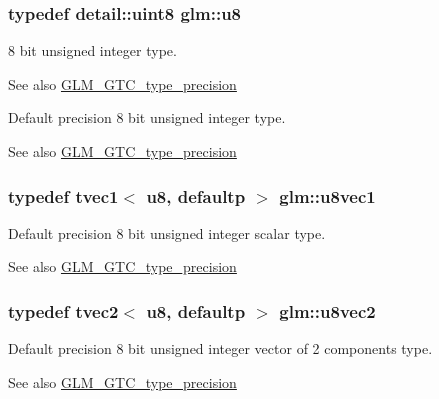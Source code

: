 \subsubsection[{u8}]{\setlength{\rightskip}{0pt plus 5cm}typedef {\bf detail\+::uint8} {\bf glm\+::u8}}\label{group__gtc__type__precision_ga5e3dc67373d5068997d2d9f41c9024d2}
8 bit unsigned integer type. \begin{DoxySeeAlso}{See also}
\hyperlink{group__gtc__type__precision}{G\+L\+M\+\_\+\+G\+T\+C\+\_\+type\+\_\+precision}
\end{DoxySeeAlso}
Default precision 8 bit unsigned integer type. \begin{DoxySeeAlso}{See also}
\hyperlink{group__gtc__type__precision}{G\+L\+M\+\_\+\+G\+T\+C\+\_\+type\+\_\+precision} 
\end{DoxySeeAlso}
\hypertarget{group__gtc__type__precision_ga024be724ff45865952190522b03fc0d5}{}
\subsubsection[{u8vec1}]{\setlength{\rightskip}{0pt plus 5cm}typedef tvec1$<$ u8, defaultp $>$ {\bf glm\+::u8vec1}}\label{group__gtc__type__precision_ga024be724ff45865952190522b03fc0d5}
Default precision 8 bit unsigned integer scalar type. \begin{DoxySeeAlso}{See also}
\hyperlink{group__gtc__type__precision}{G\+L\+M\+\_\+\+G\+T\+C\+\_\+type\+\_\+precision} 
\end{DoxySeeAlso}
\hypertarget{group__gtc__type__precision_ga1c259b876f8757eb197b83a5fab476f0}{}
\subsubsection[{u8vec2}]{\setlength{\rightskip}{0pt plus 5cm}typedef tvec2$<$ u8, defaultp $>$ {\bf glm\+::u8vec2}}\label{group__gtc__type__precision_ga1c259b876f8757eb197b83a5fab476f0}
Default precision 8 bit unsigned integer vector of 2 components type. \begin{DoxySeeAlso}{See also}
\hyperlink{group__gtc__type__precision}{G\+L\+M\+\_\+\+G\+T\+C\+\_\+type\+\_\+precision} 
\end{DoxySeeAlso}
\hypertarget{group__gtc__type__precision_ga8262aeb120701de1b57773eb10be0f35}{}
